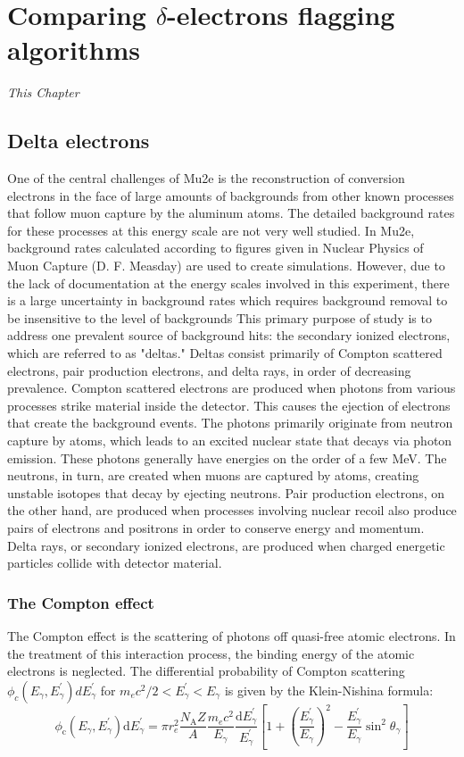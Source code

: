 \chapter{Comparing $\delta$-electrons flagging algorithms}\label{delta}
\textit{This Chapter}
\section{Delta electrons}
One of the central challenges of Mu2e is the reconstruction of conversion electrons in the face of
large amounts of backgrounds from other known processes that follow muon capture by the
aluminum atoms. The detailed background rates for these processes at this energy scale are not very
well studied. In Mu2e, background rates calculated according to figures given in Nuclear Physics of
Muon Capture (D. F. Measday) are used to create simulations. However, due to the lack of
documentation at the energy scales involved in this experiment, there is a large uncertainty in
background rates which requires background removal to be insensitive to the level of backgrounds
This primary purpose of study is to address one prevalent source of background hits: the
secondary ionized electrons, which are referred to as "deltas." Deltas consist primarily of Compton
scattered electrons, pair production electrons, and delta rays, in order of decreasing prevalence.
Compton scattered electrons are produced when photons from various processes strike material
inside the detector. This causes the ejection of electrons that create the background events. The
photons primarily originate from neutron capture by atoms, which leads to an excited nuclear state
that decays via photon emission. These photons generally have energies on the order of a few MeV.
The neutrons, in turn, are created when muons are captured by atoms, creating unstable isotopes that
decay by ejecting neutrons. Pair production electrons, on the other hand, are produced when
processes involving nuclear recoil also produce pairs of electrons and positrons in order to conserve
energy and momentum. Delta rays, or secondary ionized electrons, are produced when charged
energetic particles collide with detector material.

\subsection{The Compton effect}
The Compton effect is the scattering of photons off quasi-free atomic electrons. 
In the treatment of this interaction process, the binding energy of
the atomic electrons is neglected. The differential probability of 
Compton scattering $\phi_c(E_\gamma, E^'_\gamma) dE^'_\gamma$ for $m_e c^2/2 < E^'_\gamma < E_\gamma$ 
is given by the Klein-Nishina formula:
\begin{equation}
    \phi_{\mathrm{c}}\left(E_\gamma, E_\gamma^{\prime}\right) \mathrm{d} E_\gamma^{\prime}=\pi r_e^2 \frac{N_{\mathrm{A}} Z}{A} \frac{m_e c^2}{E_\gamma} \frac{\mathrm{d} E_\gamma^{\prime}}{E_\gamma^{\prime}}\left[1+\left(\frac{E_\gamma^{\prime}}{E_\gamma}\right)^2-\frac{E_\gamma^{\prime}}{E_\gamma} \sin ^2 \theta_\gamma\right]
\end{equation}

